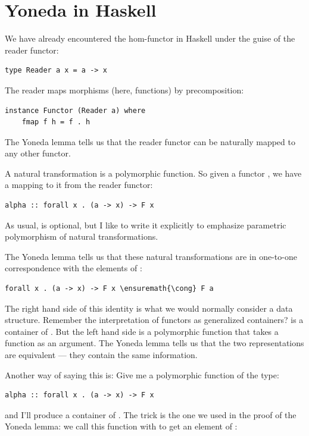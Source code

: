\section{Yoneda in Haskell}

We have already encountered the hom-functor in Haskell under the guise
of the reader functor:

\begin{Verbatim}
type Reader a x = a -> x
\end{Verbatim}
The reader maps morphisms (here, functions) by precomposition:

\begin{Verbatim}
instance Functor (Reader a) where
    fmap f h = f . h
\end{Verbatim}
The Yoneda lemma tells us that the reader functor can be naturally
mapped to any other functor.

A natural transformation is a polymorphic function. So given a functor
, we have a mapping to it from the reader functor:

\begin{Verbatim}
alpha :: forall x . (a -> x) -> F x
\end{Verbatim}
As usual,  is optional, but I like to write it explicitly
to emphasize parametric polymorphism of natural transformations.

The Yoneda lemma tells us that these natural transformations are in
one-to-one correspondence with the elements of :

\begin{Verbatim}[commandchars=\\\{\}]
forall x . (a -> x) -> F x \ensuremath{\cong} F a
\end{Verbatim}
The right hand side of this identity is what we would normally consider
a data structure. Remember the interpretation of functors as generalized
containers?  is a container of . But the left
hand side is a polymorphic function that takes a function as an
argument. The Yoneda lemma tells us that the two representations are
equivalent --- they contain the same information.

Another way of saying this is: Give me a polymorphic function of the
type:

\begin{Verbatim}
alpha :: forall x . (a -> x) -> F x
\end{Verbatim}
and I'll produce a container of . The trick is the one we used
in the proof of the Yoneda lemma: we call this function with 
to get an element of :

